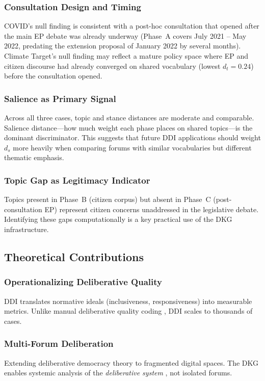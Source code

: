 \documentclass[sigconf,natbib]{acmart}
\begin{document}
\subsubsection{Consultation Design and Timing}
COVID's null finding is consistent with a post-hoc consultation that opened after
the main EP debate was already underway (Phase~A covers July 2021 -- May 2022,
predating the extension proposal of January 2022 by several months).
Climate Target's null finding may reflect a mature policy space where
EP and citizen discourse had already converged on shared vocabulary (lowest $d_t = 0.24$)
before the consultation opened.

\subsubsection{Salience as Primary Signal}
Across all three cases, topic and stance distances are moderate and comparable.
Salience distance---how much weight each phase places on shared topics---is the dominant
discriminator. This suggests that future DDI applications should weight $d_s$ more heavily
when comparing forums with similar vocabularies but different thematic emphasis.

\subsubsection{Topic Gap as Legitimacy Indicator}
Topics present in Phase~B (citizen corpus) but absent in Phase~C (post-consultation EP) represent
citizen concerns unaddressed in the legislative debate. Identifying these gaps computationally
is a key practical use of the DKG infrastructure.

\subsection{Theoretical Contributions}

\subsubsection{Operationalizing Deliberative Quality}
DDI translates normative ideals (inclusiveness, responsiveness) into measurable metrics. Unlike manual deliberative quality coding \citep{Steenbergen2003}, DDI scales to thousands of cases.

\subsubsection{Multi-Forum Deliberation}
Extending deliberative democracy theory \citep{Dryzek2000} to fragmented digital spaces. The DKG enables systemic analysis of the \textit{deliberative system} \citep{Parkinson2012}, not isolated forums.
\end{document}
